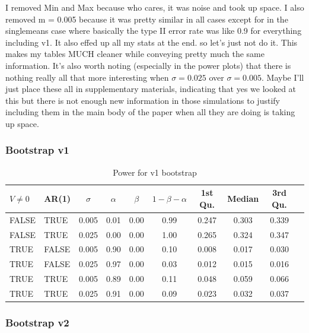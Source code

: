 \documentclass{article}
\begin{document}
I removed Min and Max because who cares, it was noise and took up space. I also removed m = 0.005 because it was pretty similar in all cases except for in the singlemeans case where basically the type II error rate was like 0.9 for everything including v1. It also effed up all my stats at the end. so let's just not do it. This makes my tables MUCH cleaner while conveying pretty much the same information. It's also worth noting (especially in the power plots) that there is nothing really all that more interesting when $\sigma = 0.025$ over $\sigma = 0.005$. Maybe I'll just place these all in supplementary materials, indicating that yes we looked at this but there is not enough new information in those simulations to justify including them in the main body of the paper when all they are doing is taking up space.



\subsubsection{Bootstrap v1}

\begin{table}[H]
\centering
\begin{tabular}{llcccccccc}
  \hline
$V \not= 0$ & AR(1) & $\sigma$ & $\alpha$ & $\beta$ & $1 - \beta - \alpha$ & 1st Qu. & Median & 3rd Qu.  \\ 
  \hline
FALSE & TRUE & 0.005 & 0.01 & 0.00 & 0.99 & 0.247 & 0.303 & 0.339 \\ 
  FALSE & TRUE & 0.025 & 0.00 & 0.00 & 1.00 & 0.265 & 0.324 & 0.347 \\ 
  TRUE & FALSE & 0.005 & 0.90 & 0.00 & 0.10 & 0.008 & 0.017 & 0.030 \\ 
  TRUE & FALSE & 0.025 & 0.97 & 0.00 & 0.03 & 0.012 & 0.015 & 0.016 \\ 
  TRUE & TRUE & 0.005 & 0.89 & 0.00 & 0.11 & 0.048 & 0.059 & 0.066 \\ 
  TRUE & TRUE & 0.025 & 0.91 & 0.00 & 0.09 & 0.023 & 0.032 & 0.037 \\ 
   \hline
\end{tabular}
\caption{Power for v1 bootstrap} 
\label{tab:bad_boot_pwr}
\end{table}

\subsubsection{Bootstrap v2}
\end{document}
